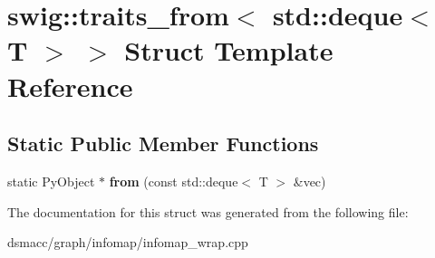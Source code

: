 \hypertarget{structswig_1_1traits__from_3_01std_1_1deque_3_01T_01_4_01_4}{}\section{swig\+:\+:traits\+\_\+from$<$ std\+:\+:deque$<$ T $>$ $>$ Struct Template Reference}
\label{structswig_1_1traits__from_3_01std_1_1deque_3_01T_01_4_01_4}
\subsection*{Static Public Member Functions}
\begin{DoxyCompactItemize}
\item 
\mbox{\label{structswig_1_1traits__from_3_01std_1_1deque_3_01T_01_4_01_4_a27419557911813b470c0b7d3e784472f}} 
static Py\+Object $\ast$ {\bfseries from} (const std\+::deque$<$ T $>$ \&vec)
\end{DoxyCompactItemize}


The documentation for this struct was generated from the following file\+:\begin{DoxyCompactItemize}
\item 
dsmacc/graph/infomap/infomap\+\_\+wrap.\+cpp\end{DoxyCompactItemize}
